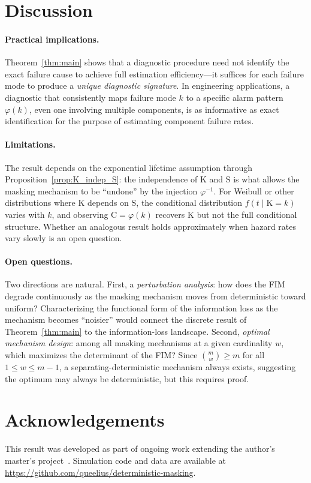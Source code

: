 \documentclass[preprint,12pt]{elsarticle}
\newcommand{\RV}[1]{\mathrm{#1}}
\newcommand{\sv}{\RV{S}}           %
\newcommand{\cand}{\RV{C}}         %
\newcommand{\pdf}{f}
\theoremstyle{definition}
\theoremstyle{remark}
\begin{document}
\section{Discussion}
\label{sec:discussion}

\paragraph{Practical implications.}
Theorem~\ref{thm:main} shows that a diagnostic procedure need not identify the
exact failure cause to achieve full estimation efficiency---it suffices for each
failure mode to produce a \emph{unique diagnostic signature}. In engineering
applications, a diagnostic that consistently maps failure mode $k$ to a specific
alarm pattern $\varphi(k)$, even one involving multiple components, is as
informative as exact identification for the purpose of estimating component
failure rates.

\paragraph{Limitations.}
The result depends on the exponential lifetime assumption through
Proposition~\ref{prop:K_indep_S}: the independence of $\RV{K}$ and $\sv$ is what
allows the masking mechanism to be ``undone'' by the injection $\varphi^{-1}$.
For Weibull or other distributions where $\RV{K}$ depends on $\sv$, the
conditional distribution $\pdf(t \mid \RV{K} = k)$ varies with $k$, and
observing $\cand = \varphi(k)$ recovers $\RV{K}$ but not the full conditional
structure. Whether an analogous result holds approximately when hazard rates vary
slowly is an open question.

\paragraph{Open questions.}
Two directions are natural. First, a \emph{perturbation analysis}: how does the
FIM degrade continuously as the masking mechanism moves from deterministic toward
uniform? Characterizing the functional form of the information loss as the
mechanism becomes ``noisier'' would connect the discrete result of
Theorem~\ref{thm:main} to the information-loss landscape. Second,
\emph{optimal mechanism design}: among all masking mechanisms at a given
cardinality $w$, which maximizes the determinant of the FIM? Since
$\binom{m}{w} \geq m$ for all $1 \leq w \leq m-1$, a
separating-deterministic mechanism always exists, suggesting the
optimum may always be deterministic, but this requires proof.

\section*{Acknowledgements}
This result was developed as part of ongoing work extending the author's
master's project~\cite{towell2023reliability}. Simulation code and data are
available at \url{https://github.com/queelius/deterministic-masking}.



\end{document}
